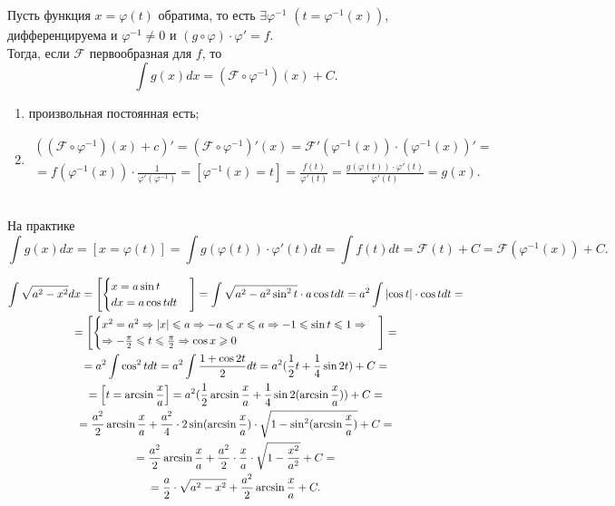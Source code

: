 \begin{theorem}
	Пусть функция $x = \varphi(t)$ обратима, то есть $\exists \varphi^{-1}$ $(t = \varphi^{-1}(x))$, дифференцируема и $\varphi^{-1} \neq 0$ и $(g \circ \varphi)\cdot\varphi' = f$.\\
	Тогда, если $\mathcal{F}$ первообразная для $f$, то $$\int g(x)dx = (\mathcal{F}\circ \varphi^{-1})(x) + C.$$
\end{theorem}
\begin{Proof}
	\begin{enumerate}
		\item произвольная постоянная есть;
		\item \begin{multline*}
			((\mathcal{F}\circ \varphi^{-1})(x) + c)' = (\mathcal{F}\circ \varphi^{-1})'(x) = \mathcal{F}'(\varphi^{-1}(x))\cdot (\varphi^{-1}(x))' = \\
			= f(\varphi^{-1}(x))\cdot\frac{1}{\varphi'(\varphi^{-1})} =
			\left[ \varphi^{-1}(x) = t \right] = \frac{f(t)}{\varphi'(t)} = \frac{g(\varphi(t))\cdot\varphi'(t)}{\varphi'(t)} = g(x).
		\end{multline*}
	\end{enumerate}
\end{Proof}\\
На практике 
$$\int g(x)dx = \left[ x = \varphi(t) \right] = \int g(\varphi(t))\cdot \varphi '(t)dt = \int f(t)dt = \mathcal{F}(t) + C= \mathcal{F}( \varphi^{-1}(x)) + C.$$
\begin{example}
	\begin{multline*}
		\int \sqrt{a^2 - x^2}dx =
		\left[ \begin{cases}
			x = a \sin t \\
			dx = a \cos tdt
		\end{cases} \right] = 
		\int \sqrt{a^2 - a^2 \sin ^2 t} \cdot a \cos t dt =
		a^2 \int \left| \cos t \right| \cdot \cos t dt = \\
		= \left[ \begin{cases}
			x^2 = a^2 \Rightarrow |x| \leqslant a \Rightarrow -a \leqslant x \leqslant a \Rightarrow -1 \leqslant \sin t \leqslant 1 \Rightarrow\\
			\Rightarrow -\frac{\pi}{2} \leqslant t \leqslant \frac{\pi}{2} \Rightarrow \cos x \geqslant 0
		\end{cases} \right] = \\
		= a^2 \int \cos ^2 t dt = a^2 \int \frac{1 + \cos 2t}{2}dt = a^2 (\frac{1}{2}t + \frac{1}{4}\sin 2t) + C = \\
		= \left[ t = \arcsin \frac{x}{a} \right] = a^2 (\frac{1}{2}\arcsin \frac{x}{a} + \frac{1}{4}\sin 2(\arcsin \frac{x}{a})) + C = \\
		= \frac{a^2}{2} \arcsin \frac{x}{a} + \frac{a^2}{4} \cdot 2\sin(\arcsin\frac{x}{a})\cdot \sqrt{1 - \sin^2(\arcsin\frac{x}{a})} + C = \\
		= \frac{a^2}{2} \arcsin \frac{x}{a} + \frac{a^2}{2} \cdot \frac{x}{a} \cdot \sqrt{1 - \frac{x^2}{a^2}} + C = \\
		= \frac{a}{2}\cdot\sqrt{a^2 - x^2} + \frac{a^2}{2}\arcsin\frac{x}{a} + C.
	\end{multline*}
\end{example}
